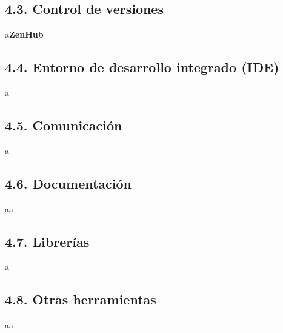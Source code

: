 \subsection{4.3. Control de versiones}

a\textbf{ZenHub}

\subsection{4.4. Entorno de desarrollo integrado (IDE)}

a

\subsection{4.5. Comunicación}

a

\subsection{4.6. Documentación}

aa

\subsection{4.7. Librerías}

a

\subsection{4.8. Otras herramientas}

aa